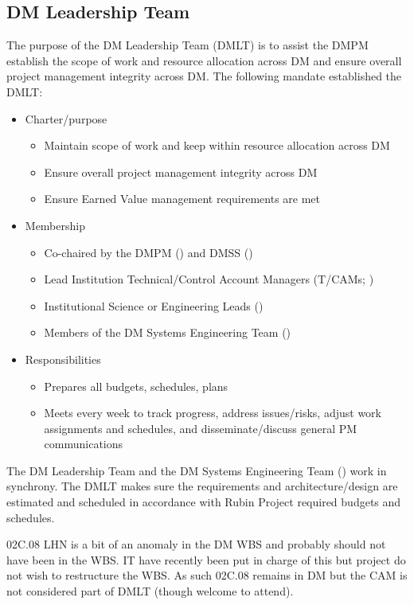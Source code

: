 \subsection{DM Leadership Team \label{sect:dmlt}}

The purpose of the DM Leadership Team (DMLT) is to assist the DMPM  establish the scope of work and resource allocation across DM and ensure overall project management integrity across DM.
The following mandate established the DMLT:

\begin{itemize}
\item Charter/purpose
	\begin{itemize}
	\item Maintain scope of work and keep within resource allocation across DM
	\item Ensure overall project management integrity across DM
	\item Ensure Earned Value management requirements are met
	\end{itemize}
\item Membership
	\begin{itemize}
	\item Co-chaired by the \gls{DMPM} () and \gls{DMSS} ()
	\item Lead Institution Technical/Control Account Managers (T/CAMs; )
	\item Institutional Science or Engineering Leads ()
	\item Members of the DM Systems Engineering Team ()
	\end{itemize}
\item Responsibilities
	\begin{itemize}
	\item Prepares all budgets, schedules, plans
	\item Meets every week to track progress, address issues/risks, adjust work assignments and schedules, and disseminate/discuss general PM communications
	\end{itemize}
\end{itemize}

The DM Leadership Team and the DM Systems Engineering Team () work in synchrony.
The DMLT makes sure the requirements and architecture/design are estimated and scheduled in accordance with Rubin Project required budgets and schedules.

 02C.08 LHN is a bit of an anomaly in the DM WBS and probably should not have been in the WBS. IT have recently been put in charge of this but project do not wish to restructure the WBS. As such  02C.08 remains in DM but the CAM is not considered part of DMLT (though welcome to attend).

